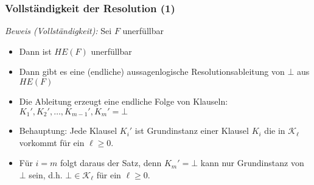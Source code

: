 \documentclass[aspectratio=1610,onlymath]{beamer}
\begin{document}
\begin{frame}[t]\frametitle{Vollständigkeit der Resolution (1)}

\pause

\emph{Beweis (Vollständigkeit):} Sei $F$ unerfüllbar
\begin{itemize}
\item Dann ist $HE(F)$ unerfüllbar
\item Dann gibt es eine (endliche) aussagenlogische Resolutionsableitung von $\bot$ aus $HE(F)$
\item Die Ableitung erzeugt eine endliche Folge von Klauseln: $K_1',K_2',\ldots,K_{m-1}',K_m'=\bot$
\item \alert{Behauptung:} Jede Klausel $K_i'$ ist Grundinstanz einer Klausel $K_i$ die in $\mathcal{K}_\ell$ vorkommt für ein $\ell\geq 0$.
\item Für $i=m$ folgt daraus der Satz, denn $K_m'=\bot$ kann nur Grundinstanz von $\bot$ sein, d.h. $\bot\in\mathcal{K}_\ell$ für ein $\ell\geq 0$.
\end{itemize}

\end{frame}
\end{document}
